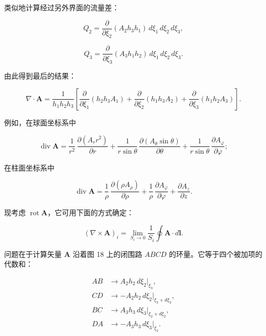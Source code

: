 \documentclass[11pt,a4paper,oneside]{ctexbook}
\newcommand{\ve}[1]{\bm{#1}}
\begin{document}
类似地计算经过另外界面的流量差：

\begin{equation*}
Q_2 = \frac{\partial}{\partial\xi_2} (A_2 h_3 h_1)\, d\xi_1\, d\xi_2\, d\xi_3,
\end{equation*}

\begin{equation*}
Q_3 = \frac{\partial}{\partial\xi_3} (A_3 h_1 h_2)\, d\xi_1\, d\xi_2\, d\xi_3.
\end{equation*}

由此得到最后的结果：

\begin{equation*}
\nabla \cdot \ve{A} = \frac{1}{h_1 h_2 h_3} \left[ \frac{\partial}{\partial\xi_1} (h_2 h_3 A_1) + \frac{\partial}{\partial\xi_2} (h_1 h_3 A_2) + \frac{\partial}{\partial\xi_3} (h_1 h_2 A_3) \right].
\end{equation*}

例如，在球面坐标系中

\begin{equation*}
\operatorname{div}\ve{A} = \frac{1}{r^{2}}\, \frac{\partial (A_r r^{2})}{\partial r} + \frac{1}{r\sin\theta}\, \frac{\partial (A_\theta \sin\theta)}{\partial\theta} + \frac{1}{r\sin\theta}\, \frac{\partial A_\varphi}{\partial\varphi};
\end{equation*}

在柱面坐标系中

\begin{equation*}
\operatorname{div}\ve{A} = \frac{1}{\rho}\, \frac{\partial (\rho A_\rho)}{\partial\rho} + \frac{1}{\rho}\, \frac{\partial A_\varphi}{\partial\varphi} + \frac{\partial A_z}{\partial z}.
\end{equation*}

现考虑 $\operatorname{rot}\ve{A}$，它可用下面的方式确定：

\begin{equation*}
(\nabla \times \ve{A})_i = \lim_{S_i \to 0} \frac{1}{S_i} \oint \ve{A} \cdot d\ve{l}.
\end{equation*}

问题在于计算矢量 $\ve{A}$ 沿着图 18 上的闭围路 $ABCD$ 的环量。它等于四个被加项的代数和：

\begin{equation*}
\begin{aligned}
AB &\longrightarrow A_2 h_2\, d\xi_2 \big|_{\xi_3},\\
CD &\longrightarrow -A_2 h_2\, d\xi_2 \big|_{\xi_3 + d\xi_3},\\
BC &\longrightarrow A_3 h_3\, d\xi_3 \big|_{\xi_2 + d\xi_2},\\
DA &\longrightarrow -A_3 h_3\, d\xi_3 \big|_{\xi_2}.
\end{aligned}
\end{equation*}
\end{document}
